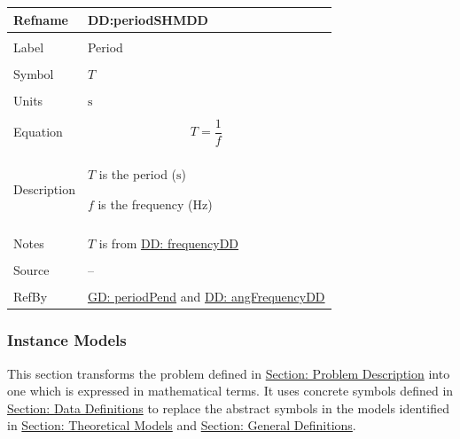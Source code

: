 \documentclass[12pt]{article}
\begin{document}
\vspace{\baselineskip}
\noindent
\begin{minipage}{\textwidth}
\begin{tabular}{>{\raggedright}p{}>{\raggedright\arraybackslash}p{}}
\toprule \textbf{Refname} & \textbf{DD:periodSHMDD}
\label{DD:periodSHMDD}
\\ \midrule \\
Label & Period
        
\\ \midrule \\
Symbol & $T$
         
\\ \midrule \\
Units & ${\text{s}}$
        
\\ \midrule \\
Equation & \begin{displaymath}
           T=\frac{1}{f}
           \end{displaymath}
\\ \midrule \\
Description & \begin{symbDescription}
              \item{$T$ is the period (${\text{s}}$)}
              \item{$f$ is the frequency (${\text{Hz}}$)}
              \end{symbDescription}
\\ \midrule \\
Notes & $T$ is from \hyperref[DD:frequencyDD]{DD: frequencyDD}
        
\\ \midrule \\
Source & --
         
\\ \midrule \\
RefBy & \hyperref[GD:periodPend]{GD: periodPend} and \hyperref[DD:angFrequencyDD]{DD: angFrequencyDD}
        
\\ \bottomrule
\end{tabular}
\end{minipage}

\subsubsection{Instance Models}
\label{Sec:IMs}
This section transforms the problem defined in \hyperref[Sec:ProbDesc]{Section: Problem Description} into one which is expressed in mathematical terms. It uses concrete symbols defined in \hyperref[Sec:DDs]{Section: Data Definitions} to replace the abstract symbols in the models identified in \hyperref[Sec:TMs]{Section: Theoretical Models} and \hyperref[Sec:GDs]{Section: General Definitions}.
\end{document}
